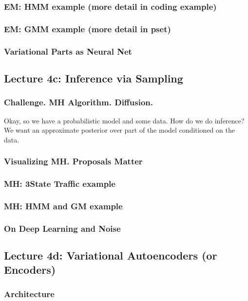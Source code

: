 \documentclass[12pt]{article}
\begin{document}
      \subsubsection*{EM: HMM example (more detail in coding example)}
      \subsubsection*{EM: GMM example (more detail in pset)}
      \subsubsection*{Variational Parts as Neural Net}
    \newpage

    \subsection*{Lecture 4c: Inference via Sampling} %
      \subsubsection*{Challenge.  MH Algorithm.  Diffusion.}
        Okay, so we have a probabilistic model and some data.  How do we do
        inference?  We want an approximate posterior over part of the model
        conditioned on the data.
      \subsubsection*{Visualizing MH.  Proposals Matter}
      \subsubsection*{MH: 3State Traffic example}
      \subsubsection*{MH: HMM and GM example}
      \subsubsection*{On Deep Learning and Noise}
    \newpage

    \subsection*{Lecture 4d: Variational Autoencoders (or Encoders)} %
      \subsubsection*{Architecture} %
\end{document}
